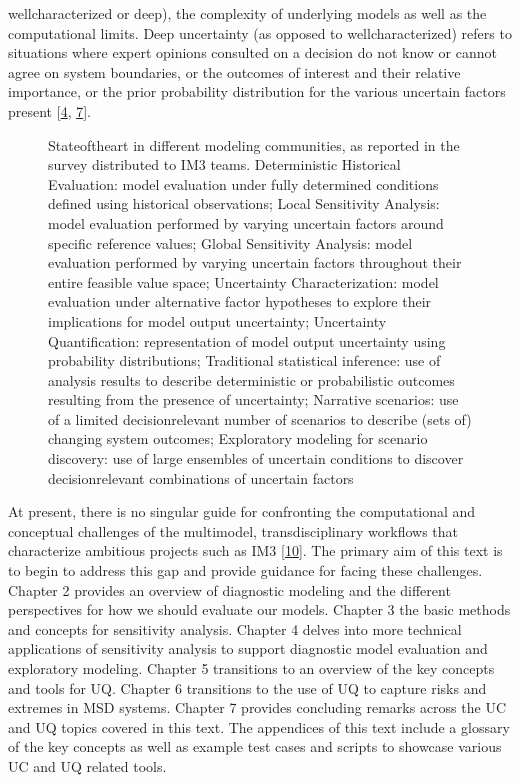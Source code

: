 \documentclass[letterpaper,10pt,english]{sphinxmanual}
\let\sphinxpxdimen\pdfpxdimen\else\newdimen\sphinxpxdimen
\begin{document}
well\sphinxhyphen{}characterized or deep), the complexity of underlying models as well as the computational limits. Deep uncertainty (as opposed to well\sphinxhyphen{}characterized) refers to situations where expert opinions consulted on a decision do not know or cannot agree on system boundaries, or the outcomes of interest and their relative importance, or the prior probability distribution for the various uncertain factors present {[}\hyperlink{cite.index:id9}{4}, \hyperlink{cite.index:id8}{7}{]}.

\begin{figure}[htbp]
\centering
\capstart

\noindent\sphinxincludegraphics[width=700\sphinxpxdimen]{{figure1_state_of_the_science}.png}
\caption{State\sphinxhyphen{}of\sphinxhyphen{}the\sphinxhyphen{}art in different modeling communities, as reported in the survey distributed to IM3 teams. Deterministic Historical Evaluation: model evaluation under fully determined conditions defined using historical observations; Local Sensitivity Analysis: model evaluation performed by varying uncertain factors around specific reference values; Global Sensitivity Analysis: model evaluation performed by varying uncertain factors throughout their entire feasible value space; Uncertainty Characterization: model evaluation under alternative factor hypotheses to explore their implications for model output uncertainty; Uncertainty Quantification: representation of model output uncertainty using probability distributions; Traditional statistical inference: use of analysis results to describe deterministic or probabilistic outcomes resulting from the presence of uncertainty; Narrative scenarios: use of a limited decision\sphinxhyphen{}relevant number of scenarios to describe (sets of) changing system outcomes; Exploratory modeling for scenario discovery: use of large ensembles of uncertain conditions to discover decision\sphinxhyphen{}relevant combinations of uncertain factors}\label{\detokenize{1_introduction:id9}}\end{figure}

\sphinxAtStartPar
At present, there is no singular guide for confronting the computational and conceptual challenges of the multi\sphinxhyphen{}model, transdisciplinary workflows that characterize ambitious projects such as IM3 {[}\hyperlink{cite.index:id10}{10}{]}. The primary aim of this text is to begin to address this gap and provide guidance for facing these challenges. Chapter 2 provides an overview of diagnostic modeling and the different perspectives for how we should evaluate our models. Chapter 3 the basic methods and concepts for sensitivity analysis. Chapter 4 delves into more technical applications of sensitivity analysis to support diagnostic model evaluation and exploratory modeling. Chapter 5 transitions to an overview of the key concepts and tools for UQ. Chapter 6 transitions to the use of UQ to capture risks and extremes in MSD systems. Chapter 7 provides concluding remarks across the UC and UQ topics covered in this text. The appendices of this text include a glossary of the key concepts as well as example test cases and scripts to showcase various UC and UQ related tools.
\end{document}
